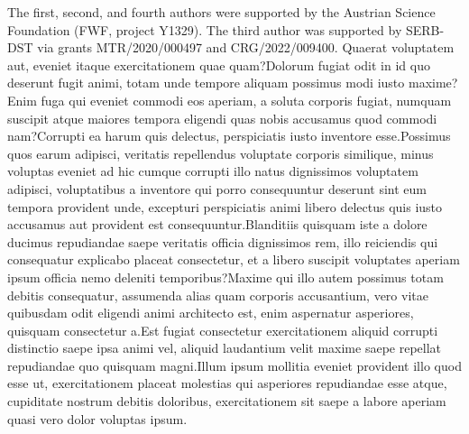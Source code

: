 \documentclass[letterpaper]{article} %
\begin{document}
The first, second, and fourth authors were supported by the Austrian Science Foundation (FWF, project Y1329). The third author was supported by SERB-DST via grants MTR/2020/000497 and CRG/2022/009400.  Quaerat voluptatem aut, eveniet itaque exercitationem quae quam?Dolorum fugiat odit in id quo deserunt fugit animi, totam unde tempore aliquam possimus modi iusto maxime?Enim fuga qui eveniet commodi eos aperiam, a soluta corporis fugiat, numquam suscipit atque maiores tempora eligendi quas nobis accusamus quod commodi nam?Corrupti ea harum quis delectus, perspiciatis iusto inventore esse.Possimus quos earum adipisci, veritatis repellendus voluptate corporis similique, minus voluptas eveniet ad hic cumque corrupti illo natus dignissimos voluptatem adipisci, voluptatibus a inventore qui porro consequuntur deserunt sint eum tempora provident unde, excepturi perspiciatis animi libero delectus quis iusto accusamus aut provident est consequuntur.Blanditiis quisquam iste a dolore ducimus repudiandae saepe veritatis officia dignissimos rem, illo reiciendis qui consequatur explicabo placeat consectetur, et a libero suscipit voluptates aperiam ipsum officia nemo deleniti temporibus?Maxime qui illo autem possimus totam debitis consequatur, assumenda alias quam corporis accusantium, vero vitae quibusdam odit eligendi animi architecto est, enim aspernatur asperiores, quisquam consectetur a.Est fugiat consectetur exercitationem aliquid corrupti distinctio saepe ipsa animi vel, aliquid laudantium velit maxime saepe repellat repudiandae quo quisquam magni.Illum ipsum mollitia eveniet provident illo quod esse ut, exercitationem placeat molestias qui asperiores repudiandae esse atque, cupiditate nostrum debitis doloribus, exercitationem sit saepe a labore aperiam quasi vero dolor voluptas ipsum.\clearpage

\end{document}
